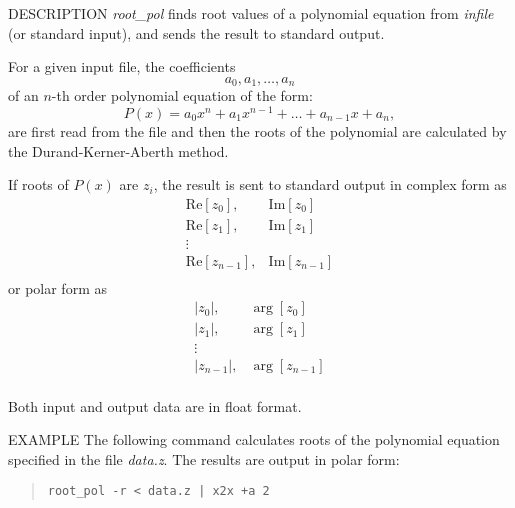 \begin{synopsis}
\item [root\_pol] [ --m $M$ ] [ --n $N$ ] [ --e $E$ ] [ --i ]
 [ --s ] [ --r ] [ {\em infile} ]
\end{synopsis}

\begin{qsection}{DESCRIPTION}
{\em root\_pol} finds root values of a polynomial equation
from {\em infile} (or standard input), 
and sends the result to standard output.

For a given input file, the coefficients
\begin{displaymath}
  a_0, a_1, \dots, a_n
\end{displaymath}
of an $n$-th order polynomial equation of the form:
\begin{displaymath}
  P(x) = a_0x^n + a_1x^{n-1} + \dots + a_{n-1}x + a_n,
\end{displaymath}
are first read from the file and then the roots of the polynomial
 are calculated by the  Durand-Kerner-Aberth method.
\par
If roots of $P(x)$ are $z_i$, 
the result is sent to standard output 
in complex form as
\begin{displaymath}
   \begin{matrix}
   \mathrm{Re}[z_0], & \mathrm{Im}[z_0] \\
   \mathrm{Re}[z_1], & \mathrm{Im}[z_1] \\
   \vdots            &                  \\
   \mathrm{Re}[z_{n-1}], & \mathrm{Im}[z_{n-1}] \\
   \end{matrix}
\end{displaymath}
or polar form as
\begin{displaymath}
   \begin{matrix}
   |z_0|, & \arg[z_0] \\
   |z_1|, & \arg[z_1] \\
   \vdots &           \\
   |z_{n-1}|, & \arg[z_{n-1}] \\
   \end{matrix}
\end{displaymath}
\par
Both input and output data are in float format.
\end{qsection}

\begin{options}
\end{options}

\begin{qsection}{EXAMPLE}
The following command calculates roots of the polynomial equation
 specified in the file {\em data.z}.
The results are output in polar form:
\begin{quote}
 \verb!root_pol -r < data.z | x2x +a 2!
\end{quote}
\end{qsection}

% 
